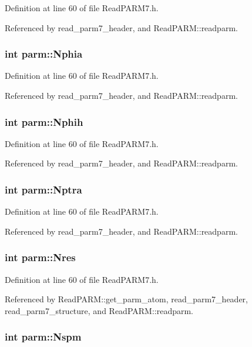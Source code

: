 Definition at line 60 of file Read\-PARM7.h.

Referenced by read\_\-parm7\_\-header, and Read\-PARM::readparm.
\subsubsection{\setlength{\rightskip}{0pt plus 5cm}int parm::Nphia}\label{structparm_m18}




Definition at line 60 of file Read\-PARM7.h.

Referenced by read\_\-parm7\_\-header, and Read\-PARM::readparm.
\subsubsection{\setlength{\rightskip}{0pt plus 5cm}int parm::Nphih}\label{structparm_m10}




Definition at line 60 of file Read\-PARM7.h.

Referenced by read\_\-parm7\_\-header, and Read\-PARM::readparm.
\subsubsection{\setlength{\rightskip}{0pt plus 5cm}int parm::Nptra}\label{structparm_m21}




Definition at line 60 of file Read\-PARM7.h.

Referenced by read\_\-parm7\_\-header, and Read\-PARM::readparm.
\subsubsection{\setlength{\rightskip}{0pt plus 5cm}int parm::Nres}\label{structparm_m15}




Definition at line 60 of file Read\-PARM7.h.

Referenced by Read\-PARM::get\_\-parm\_\-atom, read\_\-parm7\_\-header, read\_\-parm7\_\-structure, and Read\-PARM::readparm.
\subsubsection{\setlength{\rightskip}{0pt plus 5cm}int parm::Nspm}\label{structparm_m27}




